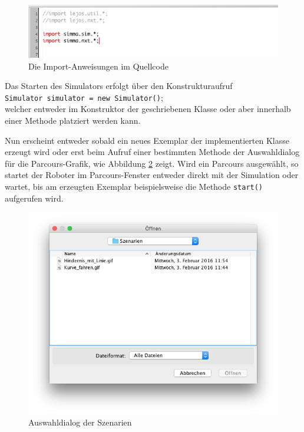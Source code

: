 \documentclass[paper=a4, DIV=calc, BCOR=12mm, twoside=on, onecolumn=on, open = right, titlepage =on, parskip =half-, headsepline = on, footsepline = off, chapterprefix = off, appendixprefix = on, fontsize = 12pt, numbers = noenddot, abstract = on]{scrbook}
\begin{document}
\begin{figure}[htb]
\centering
\includegraphics[width=\textwidth]{images/Anleitung_Import.png}
\caption{Die Import-Anweisungen im Quellcode}
\label{fig:import}
\end{figure}


Das Starten des Simulators erfolgt über den Konstrukturaufruf\\
\hspace*{2ex} \texttt{Simulator simulator = new Simulator()};\\
welcher entweder im Konstruktor der geschriebenen Klasse oder aber innerhalb einer Methode platziert werden kann.

Nun erscheint entweder sobald ein neues Exemplar der implementierten Klasse erzeugt wird oder erst beim Aufruf einer bestimmten Methode der Auswahldialog für die Parcours-Grafik, wie Abbildung \ref{fig:auswahl_szenarien} zeigt. Wird ein Parcours ausgewählt, so startet der Roboter im Parcours-Fenster entweder direkt mit der Simulation oder wartet, bis am erzeugten Exemplar beispielsweise die Methode \texttt{start()} aufgerufen wird.

\begin{figure}[htb]
\centering
\includegraphics[width=\textwidth]{images/dialog_szenarien.png}
\caption{Auswahldialog der Szenarien}
\label{fig:auswahl_szenarien}
\end{figure}
\end{document}
